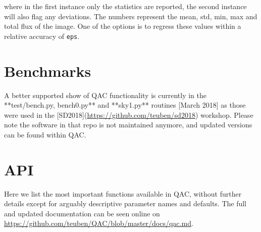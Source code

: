\documentclass[11pt,twoside]{article}
\begin{document}
where in the first instance only the statistics are reported, the second instance will also flag any deviations.
The numbers represent the mean, std, min, max and total flux of the image.   One of the options
is to regress these values within a relative accuracy of \verb+eps+.

\section{Benchmarks}

A better supported show of QAC functionality is currently in the **test/bench.py, bench0.py** and **sky1.py** routines [March 2018]
as those were used in the
[SD2018](\url{https://github.com/teuben/sd2018}) workshop. Please note the software in that repo is not maintained anymore,
and updated versions can be found
within QAC.

\section{API}

Here we list the most important functions available in QAC, without
further details except for arguably descriptive parameter names and
defaults. The full and updated documentation can be seen online on
\url{https://github.com/teuben/QAC/blob/master/docs/qac.md}.
\end{document}
